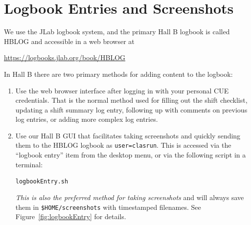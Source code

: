 \documentclass[amsmath,amssymb,notitlepage,11pt]{revtex4}
\begin{document}
\section{Logbook Entries and Screenshots}\label{sec:logentry}
We use the JLab logbook system, and the primary Hall B logbook is called HBLOG and accessible in a web browser at
\begin{center}\url{https://logbooks.jlab.org/book/HBLOG}\end{center}
In Hall B there are two primary methods for adding content to the logbook:
\begin{enumerate}
\item Use the web browser interface after logging in with your personal CUE credentials.  That is the normal method used for filling out the shift checklist, updating a shift summary log entry, following up with comments on previous log entries, or adding more complex log entries.
\item Use our Hall B GUI that facilitates taking screenshots and quickly sending them to the HBLOG logbook as \texttt{user=clasrun}.  This is accessed via the ``logbook entry'' item from the desktop menu, or via the following script in a terminal:
\begin{center}\texttt{logbookEntry.sh}\end{center}
    {\em This is also the preferred method for taking screenshots} and will always save them in \texttt{\$HOME/screenshots} with timestamped filenames.  See Figure~\ref{fig:logbookEntry} for details.
\end{enumerate}
\end{document}
